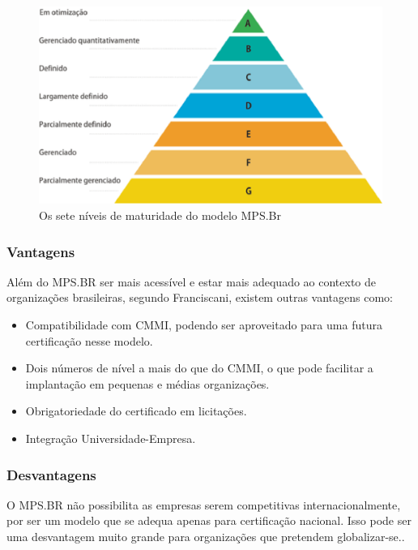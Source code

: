  \begin{figure}[!ht]
    \centering
    \includegraphics[width=15cm, keepaspectratio=true]{figuras/maturidade/niveis-mpsbr.eps}
    \caption{Os sete níveis de maturidade do modelo MPS.Br}
  \end{figure}

\subsubsection{Vantagens}

  Além do MPS.BR ser mais acessível e estar mais adequado ao contexto de
  organizações brasileiras, segundo Franciscani, existem outras vantagens
  como:

  \begin{itemize}
    \item{Compatibilidade com CMMI, podendo ser aproveitado para uma futura
          certificação nesse modelo.}
    \item{Dois números de nível a mais do que do CMMI, o que pode facilitar a
          implantação em pequenas e médias organizações.}
    \item{Obrigatoriedade do certificado em licitações.}
    \item{Integração Universidade-Empresa.}
  \end{itemize}

\subsubsection{Desvantagens}

  O MPS.BR não possibilita as empresas serem competitivas internacionalmente,
  por ser um modelo que se adequa apenas para certificação nacional. Isso pode
  ser uma desvantagem muito grande para organizações que pretendem
  globalizar-se.\cite{francis2012}.

